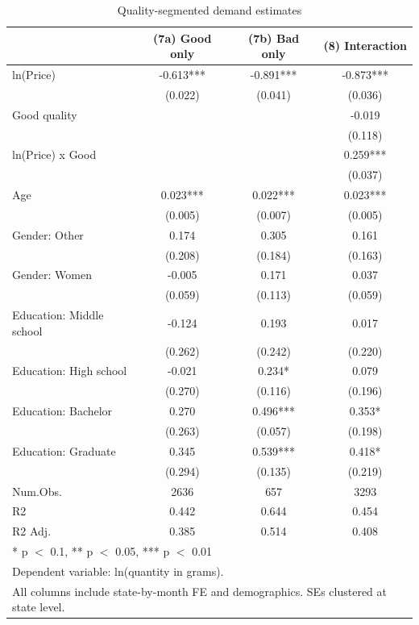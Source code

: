 \begin{table}[H]
\centering
\caption{Quality-segmented demand estimates}
\label{tab:quality-segmented}
\centering
\begin{tabular}[t]{lccc}
\toprule
  & (7a) Good only & (7b) Bad only & (8) Interaction\\
\midrule
ln(Price) & -0.613*** & -0.891*** & -0.873***\\
 & (0.022) & (0.041) & (0.036)\\
Good quality &  &  & -0.019\\
 &  &  & (0.118)\\
ln(Price) x Good &  &  & 0.259***\\
 &  &  & (0.037)\\
Age & 0.023*** & 0.022*** & 0.023***\\
 & (0.005) & (0.007) & (0.005)\\
Gender: Other & 0.174 & 0.305 & 0.161\\
 & (0.208) & (0.184) & (0.163)\\
Gender: Women & -0.005 & 0.171 & 0.037\\
 & (0.059) & (0.113) & (0.059)\\
Education: Middle school & -0.124 & 0.193 & 0.017\\
 & (0.262) & (0.242) & (0.220)\\
Education: High school & -0.021 & 0.234* & 0.079\\
 & (0.270) & (0.116) & (0.196)\\
Education: Bachelor & 0.270 & 0.496*** & 0.353*\\
 & (0.263) & (0.057) & (0.198)\\
Education: Graduate & 0.345 & 0.539*** & 0.418*\\
 & (0.294) & (0.135) & (0.219)\\
\midrule
Num.Obs. & 2636 & 657 & 3293\\
R2 & 0.442 & 0.644 & 0.454\\
R2 Adj. & 0.385 & 0.514 & 0.408\\
\bottomrule
\multicolumn{4}{l}{\rule{0pt}{1em}* p $<$ 0.1, ** p $<$ 0.05, *** p $<$ 0.01}\\
\multicolumn{4}{l}{\rule{0pt}{1em}Dependent variable: ln(quantity in grams).}\\
\multicolumn{4}{l}{\rule{0pt}{1em}All columns include state-by-month FE and demographics. SEs clustered at state level.}\\
\end{tabular}
\end{table}

